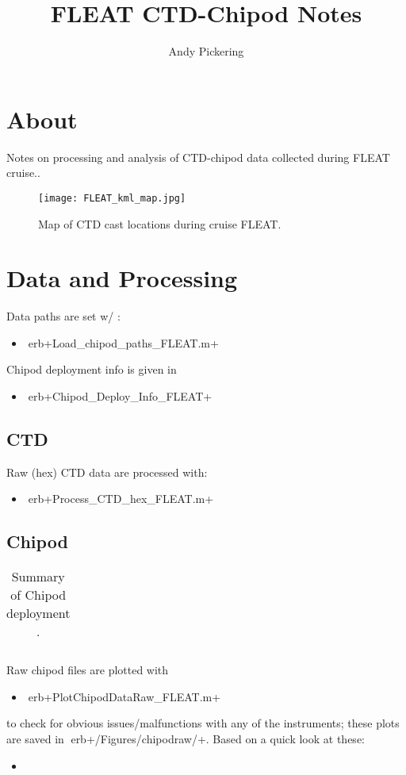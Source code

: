 \documentclass[11pt]{article}
\title{FLEAT CTD-Chipod Notes}
\author{Andy Pickering}
\begin{document}
 
\maketitle 
\tableofcontents 
\newpage 

\section{About} 

Notes on processing and analysis of CTD-chipod data collected during FLEAT cruise.. 

\begin{figure}[htbp] 
\texttt{[image: FLEAT\_kml\_map.jpg]} 
\caption{Map of CTD cast locations during cruise FLEAT.} 
\label{map} 
\end{figure} 

\section{Data and Processing} 

Data paths are set w/ :  
\begin{itemize} 
\item erb+Load_chipod_paths_FLEAT.m+ 
\end{itemize} 

Chipod deployment info is given in  
\begin{itemize} 
\item erb+Chipod_Deploy_Info_FLEAT+ 
\end{itemize} 

\subsection{CTD} 

Raw (hex) CTD data are processed with: 
\begin{itemize} 
\item erb+Process_CTD_hex_FLEAT.m+ 
\end{itemize} 

\subsection{Chipod} 

\begin{table}[htdp] 
\caption{Summary of Chipod deployment .} 
\begin{center} 
\begin{tabular}{|c|c|c|c|} 
\hline 
\end{tabular} 
\end{center} 
\label{default} 
\end{table}Raw chipod files are plotted with  
\begin{itemize} 
\item erb+PlotChipodDataRaw_FLEAT.m+ 
\end{itemize} 
to check for obvious issues/malfunctions with any of the instruments; these plots are saved in erb+/Figures/chipodraw/+.  
Based on a quick look at these: 
\begin{itemize} 
\item 
\end{itemize} 
\end{document}
